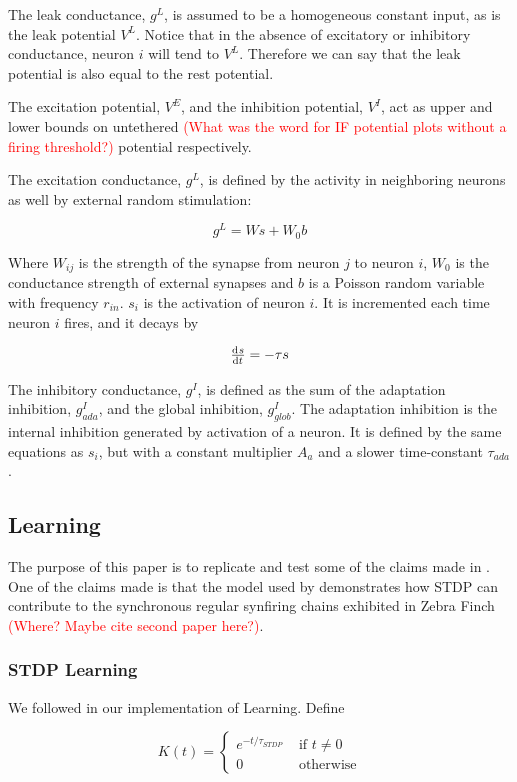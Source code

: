 \documentclass[12pt, final]{article}
\begin{document}
The leak conductance, \(g^L\), is assumed to be a homogeneous constant input, as is the leak potential \(V^L\). Notice that in the absence of excitatory or inhibitory conductance, neuron \(i\) will tend to \(V^L\). Therefore we can say that the leak potential is also equal to the rest potential.

The excitation potential, \(V^E\), and the inhibition potential, \(V^I\), act as upper and lower bounds on untethered \textcolor{red}{(What was the word for IF potential plots without a firing threshold?)} potential respectively. 

The excitation conductance, \(g^L\), is defined by the activity in neighboring neurons as well by external random stimulation:

\[g^L = Ws + W_0b\]

Where \(W_{ij}\) is the strength of the synapse from neuron \(j\) to neuron \(i\), \(W_0\) is the conductance strength of external synapses and \(b\) is a Poisson random variable with frequency \(r_{in}\). \(s_i\) is the activation of neuron \(i\). It is incremented each time neuron \(i\) fires, and it decays by

\[\od{s}{t} = -\tau s\]

The inhibitory conductance, \(g^I\), is defined as the sum of the adaptation inhibition, \(g^I_{ada}\), and the global inhibition, \(g^I_{glob}\). The adaptation inhibition is the internal inhibition generated by activation of a neuron. It is defined by the same equations as \(s_i\), but with a constant multiplier \(A_a\) and a slower time-constant \(\tau_{ada}\).

\subsection{Learning}

The purpose of this paper is to replicate and test some of the claims made in \cite{Fiete}. One of the claims made is that the model used by \cite{Fiete} demonstrates how STDP can contribute to the synchronous regular synfiring chains exhibited in Zebra Finch \textcolor{red}{(Where? Maybe cite second paper here?)}. 

\subsubsection{STDP Learning}

We followed \cite{Fiete} in our implementation of Learning. Define

\[K(t) = 
\begin{cases}
e^{-t/\tau_{STDP}} &\text{ if } t \neq 0\\
0 &\text{ otherwise}
\end{cases}
\]
\end{document}
